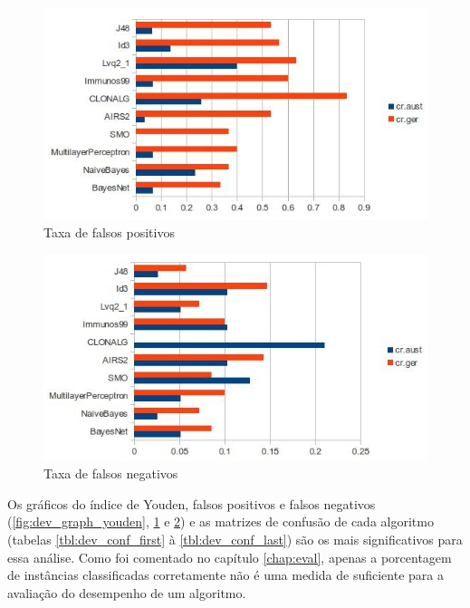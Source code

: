 \begin{figure}[h!]
    \vspace{0.5cm}
    \centering
    \caption{Taxa de falsos positivos}
    \label{fig:dev_graph_false_pos}
    \includegraphics[width=1\textwidth]{img/graph_false_pos.jpg}
\end{figure}

\begin{figure}[h!]
    \vspace{0.5cm}
    \centering
    \caption{Taxa de falsos negativos}
    \label{fig:dev_graph_false_neg}
    \includegraphics[width=1\textwidth]{img/graph_false_neg.jpg}
\end{figure}

Os gráficos do índice de Youden, falsos positivos e falsos negativos (\ref{fig:dev_graph_youden}, \ref{fig:dev_graph_false_pos} e \ref{fig:dev_graph_false_neg}) e as matrizes de confusão de cada algoritmo (tabelas \ref{tbl:dev_conf_first} à \ref{tbl:dev_conf_last}) são os mais significativos para essa análise. Como foi comentado no capítulo \ref{chap:eval}, apenas a porcentagem de instâncias classificadas corretamente não é uma medida de suficiente para a avaliação do desempenho de um algoritmo.

